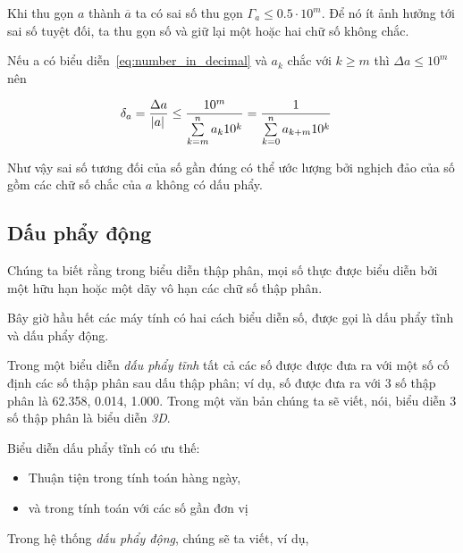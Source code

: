 \documentclass[../../Lectures.tex]{subfiles}
\begin{document}
Khi thu gọn \(a\) thành \(\overline{a}\) ta có sai số thu gọn \(\Gamma_a \leq
\num{0.5} \cdot 10^m\). Để nó ít ảnh hưởng tới sai số tuyệt đối, ta thu gọn số
và giữ lại một hoặc hai chữ số không chắc.

Nếu a có biểu diễn~\ref{eq:number_in_decimal} và \(a_k\) chắc với \(k \geq m\)
thì \(\Delta a \leq 10^m\) nên

\[\begin{aligned}
    \delta_a = \frac{\Delta a}{\abs{a}} \leq \frac{10^m}{\sum\limits_{k=m}\limits^{n} a_k 10^k} &= \frac{1}{\sum\limits_{k=0}\limits^{n} a_{k+m} 10^k}
\end{aligned}\]

Như vậy sai số tương đối của số gần đúng có thể ước lượng bởi nghịch đảo của số
gồm các chữ số chắc của \(a\) không có dấu phẩy.

\subsection{Dấu phẩy động}

Chúng ta biết rằng trong biểu diễn thập phân, mọi số thực được biểu diễn bởi một
hữu hạn hoặc một dãy vô hạn các chữ số thập phân.

Bây giờ hầu hết các máy tính có hai cách biểu diễn số, được gọi là dấu phẩy tĩnh
và dấu phẩy động.

Trong một biểu diễn \emph{dấu phẩy tĩnh} tất cả các số được được đưa ra với một
số cố định các số thập phân sau dấu thập phân; ví dụ, số được đưa ra với 3 số
thập phân là \num{62.358}, \num{0.014}, \num{1.000}. Trong một văn bản chúng ta
sẽ viết, nói, biểu diễn 3 số thập phân là biểu diễn \emph{3D}.

Biểu diễn dấu phẩy tĩnh có ưu thế:

\begin{itemize}
    \item Thuận tiện trong tính toán hàng ngày,
    \item và trong tính toán với các số gần đơn vị
\end{itemize}

Trong hệ thống \emph{dấu phẩy động}, chúng sẽ ta viết, ví dụ,
\end{document}
